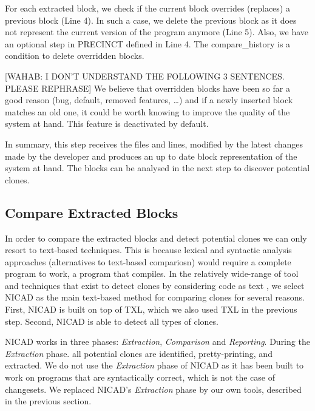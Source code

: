\documentclass[conference]{IEEEtran}
\begin{document}
For each extracted block, we check if the current block overrides (replaces) a previous block (Line 4).
In such a case, we delete the previous block as it does not represent the current version of the program anymore (Line 5).
Also, we have an optional step in PRECINCT defined in Line 4. The compare\_history is a condition to delete overridden blocks.

[WAHAB: I DON'T UNDERSTAND THE FOLLOWING 3 SENTENCES. PLEASE REPHRASE]
We believe that overridden blocks have been so far a good reason (bug, default, removed features, \ldots) and if a newly inserted block matches an old one, it could be worth knowing to improve the quality of the system at hand.
This feature is deactivated by default.

In summary, this step receives the files and lines, modified by the latest changes made by the developer and produces an up to date block representation of the system at hand. The blocks can be analysed in the next step to discover potential clones.

\subsection{Compare Extracted Blocks}
\label{sub:Compare Extracted Blocks}

In order to compare the extracted blocks and detect potential clones we can only resort to text-based techniques. This is because lexical and syntactic analysis approaches (alternatives to text-based compariosn) would require a complete program to work, a program that compiles. In the relatively wide-range of tool and techniques that exist to detect clones by considering code as text \cite{Johnson1993,Johnson1994,Marcus,Manber1994,StephaneDucasse,Wettel2005}, we select NICAD as the main text-based method for comparing clones \cite{Cordy2011} for several reasons. First, NICAD is built on top of TXL, which we also used TXL in the previous step. Second, NICAD is able to detect all types of clones.

NICAD  works in three phases: \textit{Extraction}, \textit{Comparison} and \textit{Reporting}. During the \textit{Extraction} phase. all potential clones are identified, pretty-printing, and extracted. We do not use the \textit{Extraction} phase of NICAD as it has been built to work on programs that are syntactically correct, which is not the case of changesets. We replaced NICAD's \textit{Extraction} phase by our own tools, described in the previous section.
\end{document}

